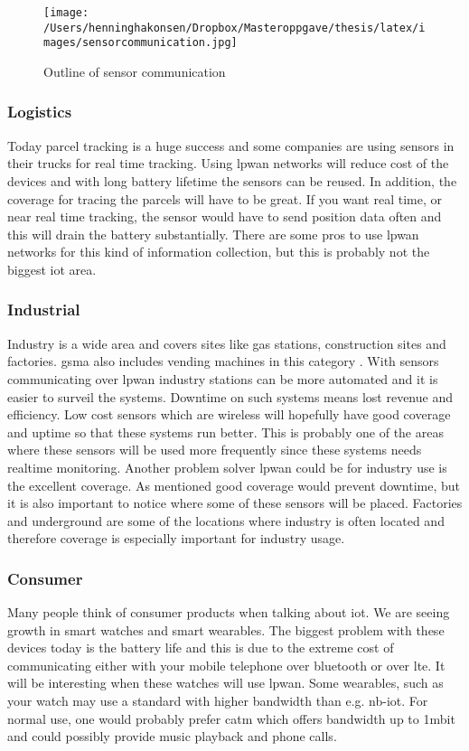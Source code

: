 \documentclass[USenglish]{ifimaster}  %
\begin{document}
\begin{figure}[H]
  \centering\texttt{[image: /Users/henninghakonsen/Dropbox/Masteroppgave/thesis/latex/images/sensorcommunication.jpg]}
  \caption[Outline of sensor communication]{Outline of sensor communication \cite{person:ola}}
  \label{pic:sensorcommunication}
\end{figure}

\subsubsection{Logistics}
Today parcel tracking is a huge success and some companies are using sensors in their trucks for real time tracking. Using \acrshort{lpwan} networks will reduce cost of the devices and with long battery lifetime the sensors can be reused. In addition, the coverage for tracing the parcels will have to be great. If you want real time, or near real time tracking, the sensor would have to send position data often and this will drain the battery substantially. There are some pros to use \acrshort{lpwan} networks for this kind of information collection, but this is probably not the biggest \acrshort{iot} area.

\subsubsection{Industrial}
Industry is a wide area and covers sites like gas stations, construction sites and factories. \acrshort{gsma} also includes vending machines in this category \cite{online:lpwaFuture}. With sensors communicating over \acrshort{lpwan} industry stations can be more automated and it is easier to surveil the systems. Downtime on such systems means lost revenue and efficiency. Low cost sensors which are wireless will hopefully have good coverage and uptime so that these systems run better. This is probably one of the areas where these sensors will be used more frequently since these systems needs realtime monitoring. Another problem solver \acrshort{lpwan} could be for industry use is the excellent coverage. As mentioned good coverage would prevent downtime, but it is also important to notice where some of these sensors will be placed. Factories and underground are some of the locations where industry is often located and therefore coverage is especially important for industry usage.

\subsubsection{Consumer}
Many people think of consumer products when talking about \acrshort{iot}. We are seeing growth in smart watches and smart wearables. The biggest problem with these devices today is the battery life and this is due to the extreme cost of communicating either with your mobile telephone over bluetooth or over \acrshort{lte}. It will be interesting when these watches will use \acrshort{lpwan}. Some wearables, such as your watch may use a standard with higher bandwidth than e.g. \acrshort{nb-iot}. For normal use, one would probably prefer \acrshort{catm} which offers bandwidth up to 1\acrshort{mbit} and could possibly provide music playback and phone calls.
\end{document}
